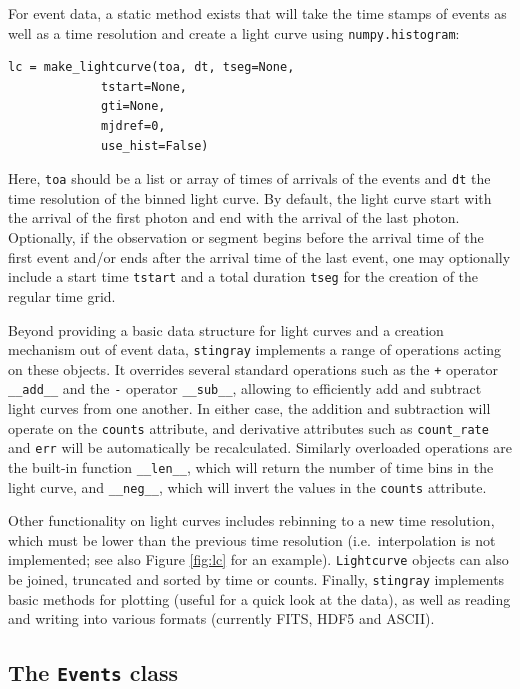 \documentclass[12pt]{emulateapj}
\newcommand{\stingray}{\texttt{stingray}\xspace}
\newcommand{\lightcurve}{\texttt{Lightcurve}\xspace}
\begin{document}
For event data, a static method exists that will take the time stamps of events as well as a time resolution and create a light curve using \texttt{numpy.histogram}:

\begin{verbatim}
lc = make_lightcurve(toa, dt, tseg=None, 
		     tstart=None, 
		     gti=None,
		     mjdref=0,
		     use_hist=False)
\end{verbatim}

Here, \texttt{toa} should be a list or array of times of arrivals of the events and \texttt{dt} the time resolution of the binned light curve. By default, the light curve start with the arrival of the first photon and end with the arrival of the last photon. Optionally, if the observation or segment begins before the arrival time of the first event and/or ends after the arrival time of the last event, one may optionally include a start time \texttt{tstart} and a total duration \texttt{tseg} for the creation of the regular time grid. 

Beyond providing a basic data structure for light curves and a creation mechanism out of event data, \stingray implements a range of operations acting on these objects. It overrides several standard operations such as the \texttt{+} operator \verb|__add__| and the \texttt{-} operator \verb|__sub__|, allowing to efficiently add and subtract light curves from one another. In either case, the addition and subtraction will operate on the \texttt{counts} attribute, and derivative attributes such as \verb|count_rate| and \texttt{err} will be automatically be recalculated. Similarly overloaded operations are the built-in function \verb|__len__|, which will return the number of time bins in the light curve, and \verb|__neg__|, which will invert the values in the \texttt{counts} attribute.

Other functionality on light curves includes rebinning to a new time resolution, which must be lower than the previous time resolution (i.e.\ interpolation is not implemented; see also Figure \ref{fig:lc} for an example). 
\lightcurve objects can also be joined, truncated and sorted by time or counts. Finally, \stingray implements basic methods for plotting (useful for a quick look at the data), as well as reading and writing into various formats (currently FITS, HDF5 and ASCII).

\subsection{The \texttt{Events} class}
\end{document}
